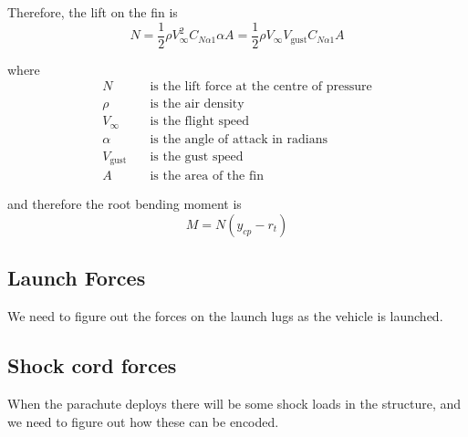 \documentclass[11pt]{article}
\newcommand{\eqn}[1]{\begin{equation}#1\end{equation}}
\newcommand{\eqnalign}[1]{\begin{align*}#1\end{align*}}
\newcommand{\half}{\frac{1}{2}}
\begin{document}
Therefore, the lift on the fin is 
\eqn{N = \half \rho V_\infty^2 C_{N\alpha1} \alpha A = \half \rho V_\infty V_\text{gust} C_{N\alpha1} A} 

where
\eqnalign{
N &\quad \text{is the lift force at the centre of pressure}\\
\rho &\quad \text{is the air density}\\
V_\infty & \quad \text{is the flight speed}\\
\alpha & \quad \text{is the angle of attack in radians}\\
V_\text{gust} & \quad \text{is the gust speed}\\
A & \quad \text{is the area of the fin}
}

and therefore the root bending moment is 
\eqn{M = N (y_{cp} - r_t)}


\subsection{Launch Forces}

We need to figure out the forces on the launch lugs as the vehicle is launched.

\subsection{Shock cord forces}

When the parachute deploys there will be some shock loads in the structure, and we need to figure out how these can be encoded. 


\newpage


\end{document}
